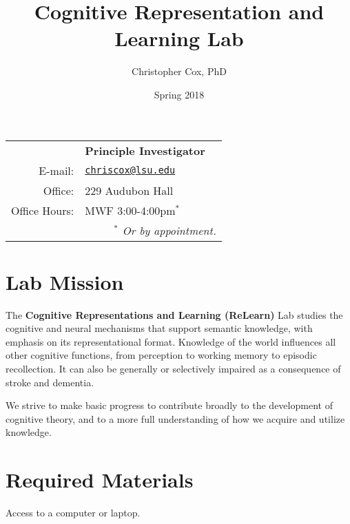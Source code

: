 \documentclass[11pt]{article}
\title{Cognitive Representation and Learning Lab}
\author{Christopher Cox, PhD}
\date{Spring 2018}
\newcommand{\blankline}{\quad\pagebreak[2]}
\begin{document}
\maketitle

\blankline

\begin{tabular*}{.93\textwidth}{@{\extracolsep{\fill}}rll}


& \textbf{Principle Investigator} \\
E-mail: & \href{mailto:chriscox@lsu.edu}{\texttt{chriscox@lsu.edu}} \\
Office: & 229 Audubon Hall \\
Office Hours: & MWF 3:00-4:00pm$^*$ \\
&  \multicolumn{2}{r}{\small \it $^*$ Or by appointment.} \\
\hline
\end{tabular*}


\section*{Lab Mission}

The \textbf{Cognitive Representations and Learning (ReLearn)} Lab studies the cognitive and neural mechanisms that support semantic knowledge, with emphasis on its representational format.
Knowledge of the world influences all other cognitive functions, from perception to working memory to episodic recollection.
It can also be generally or selectively impaired as a consequence of stroke and dementia.

We strive to make basic progress to contribute broadly to the development of cognitive theory, and to a more full understanding of how we acquire and utilize knowledge.


\section*{Required Materials}

Access to a computer or laptop.

\end{document}
